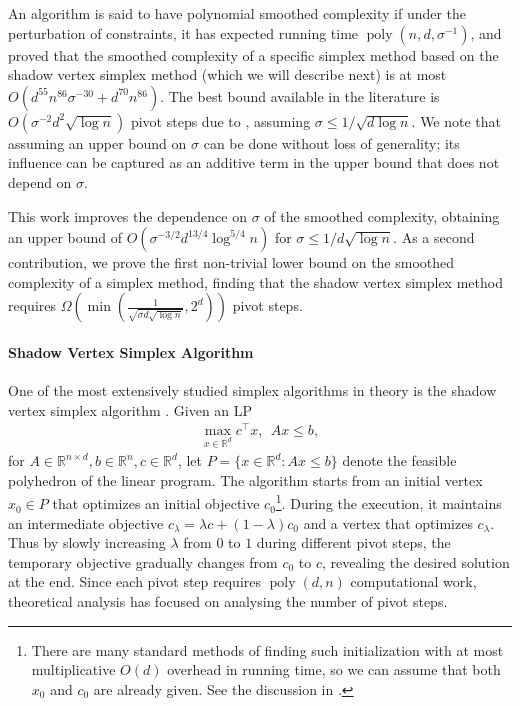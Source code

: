 \documentclass{theoretics}
\newcommand{\R}{\mathbb R}
\newcommand{\poly}{\operatorname{poly}}
\begin{document}
An algorithm is said to have polynomial smoothed complexity if under the perturbation of constraints, it has expected running
time $\poly(n,d,\sigma^{-1})$, and \cite{ST04} proved that the smoothed complexity of a specific simplex method based on the shadow vertex simplex method (which we will describe next) is at most
$O(d^{55}n^{86}\sigma^{-30} + d^{70}n^{86})$.
The best bound available in the literature is
$O(\sigma^{-2}d^2\sqrt{\log n})$ pivot steps due to \cite{DH18}, assuming $\sigma \leq 1/\sqrt{d\log n}$.
We note that assuming an upper bound on $\sigma$ can be done without loss of generality;
its influence can be captured as an additive term in the upper bound that does not depend on $\sigma$.

This work improves the dependence on $\sigma$ of the smoothed complexity, obtaining an upper bound of $O(\sigma^{-3/2} d^{13/4} \log^{5/4} n)$
for $\sigma \leq 1/d\sqrt{\log n}$.
As a second contribution, we prove the first non-trivial lower bound on the smoothed complexity of a simplex method,
finding that the shadow vertex simplex method requires $\Omega(\min(\frac{1}{\sqrt{\sigma d \sqrt{\log n}}}, 2^d))$
pivot steps.


\paragraph{Shadow Vertex Simplex Algorithm}
One of the most extensively studied simplex algorithms in theory is the shadow vertex simplex algorithm \cite{gas55,b82}.
Given an LP
\begin{align*}
    \max_{x\in \R^d} c^\top x, ~~ A x \leq b,
\end{align*}
for $A \in \R^{n\times d}, b\in \R^n, c\in \R^d$,
let $P = \{x\in \R^d : A x \leq b\}$ denote the feasible polyhedron of the linear program.
The algorithm starts from an initial vertex $x_0 \in P$ that optimizes an initial objective $c_0$\footnote{There are many standard methods of finding such initialization with at most multiplicative $O(d)$ overhead in running time, so we can assume that both $x_0$ and $c_0$ are already given. See the discussion in \cite{DH18}.}.
During the execution, it maintains an intermediate objective $c_\lambda = \lambda c + (1-\lambda) c_0$ and a vertex that optimizes $c_{\lambda}$. 
Thus by slowly increasing $\lambda$ from $0$ to $1$ during different pivot steps, the temporary objective gradually changes from $c_0$ to $c$, revealing the desired solution at the end.
Since each pivot step requires $\poly(d,n)$ computational work, theoretical analysis
has focused on analysing the number of pivot steps.
\end{document}

